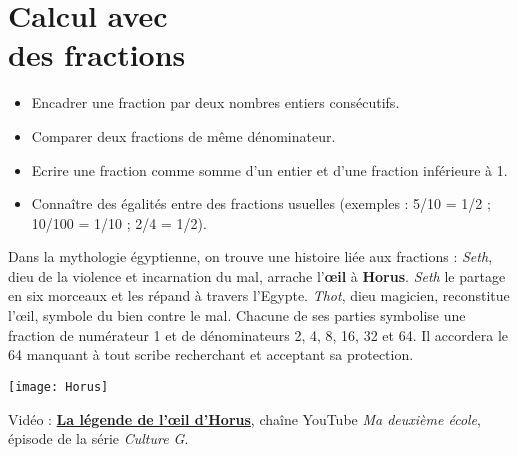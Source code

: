 \themaN
\graphicspath{{../Ch24_Comparaison_de_fractions/Images/}}

\chapter{Calcul avec\\des fractions}
\label{C20}


\begin{prerequis}
   \begin{itemize}
      \item Encadrer une fraction par deux nombres entiers consécutifs.
      \item Comparer deux fractions de même dénominateur.
      \item Ecrire une fraction comme somme d’un entier et d’une fraction inférieure à 1.
      \item Connaître des égalités entre des fractions usuelles (exemples : 5/10 = 1/2 ; 10/100 = 1/10 ; 2/4 = 1/2).
   \end{itemize}
\end{prerequis}

\vfill

\begin{debat} 
   Dans la mythologie égyptienne, on trouve une histoire liée aux fractions : {\it Seth}, dieu de la violence et incarnation du mal, arrache l’{\bf œil} à {\bf Horus}. {\it Seth} le partage en six morceaux et les répand à travers l’Egypte. {\it Thot}, dieu magicien, reconstitue l’œil, symbole du bien contre le mal. Chacune de ses parties symbolise une fraction de numérateur 1 et de dénominateurs 2, 4, 8, 16, 32 et 64. Il accordera le 64 manquant à tout scribe recherchant et acceptant sa protection.
   \begin{center}
      \texttt{[image: Horus]}
   \end{center}
   \bigskip
   \begin{cadre}[B2][F4]
      \begin{center}
         Vidéo : \href{https://www.youtube.com/watch?v=yHft4m1Gi7k}{\bf La légende de l'\oe il d'Horus}, chaîne YouTube {\it Ma deuxième école}, épisode de la série {\it Culture G}.
      \end{center}
   \end{cadre}
\end{debat}

